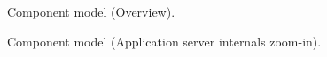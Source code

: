 \begin{figure}[H]
\centering
{}
\caption{\label{fig:component-overview}Component model (Overview).}
\end{figure}

\begin{figure}[H]
    \centering
    \caption{\label{fig:component-internal-zoom}Component model (Application server internals zoom-in).}
\end{figure}

